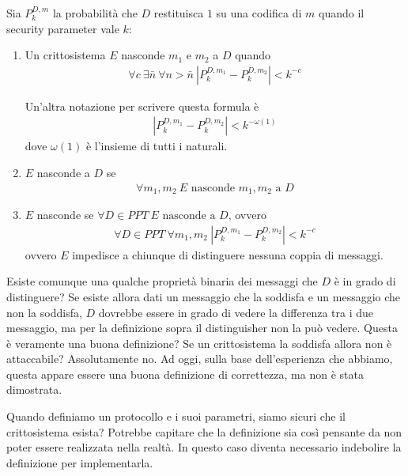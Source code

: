 \begin{definition}
Sia $P_k^{D, m}$ la probabilità che $D$ restituisca $1$ su una codifica di $m$ quando il security parameter vale $k$:
\begin{enumerate}
    \item Un crittosistema $E$ nasconde $m_1$ e $m_2$ a $D$ quando
\begin{align*}
   \forall c \ \exists {\bar{n}} \ \forall n > \bar{n} \ \left|P_{k}^{D, m_1} - P_{k}^{D, m_2}\right| < k^{-c}
\end{align*}

\noindent Un'altra notazione per scrivere questa formula è
\begin{align*}
    \left| P_k^{D, m_1} - P_k^{D, m_2} \right| < k^{-\omega(1)}
\end{align*}
\noindent dove $\omega(1)$ è l'insieme di tutti i naturali.

\item $E$ nasconde a $D$ se 
\begin{align*}
    \forall m_1, m_2 \ E \text{ nasconde } m_1, m_2 \text{ a } D
\end{align*}

\item $E$ nasconde se $\forall D \in PPT \ E \text{ nasconde a } D$, ovvero
\begin{align*}
    \forall D \in PPT \ \forall m_1,m_2 \ \left|P_{k}^{D, m_1} - P_{k}^{D, m_2}\right| < k^{-c}
\end{align*}
\noindent ovvero $E$ impedisce a chiunque di distinguere nessuna coppia di messaggi. 
\end{enumerate}
\end{definition}

\noindent Esiste comunque una qualche proprietà binaria dei messaggi che $D$ è in grado di distinguere? Se esiste allora dati un messaggio che la soddisfa e un messaggio che non la soddisfa, $D$ dovrebbe essere in grado di vedere la differenza tra i due messaggio, ma per la definizione sopra il distinguisher non la può vedere. Questa è veramente una buona definizione? Se un crittosistema la soddisfa allora non è attaccabile? Assolutamente no. Ad oggi, sulla base dell'esperienza che abbiamo, questa appare essere una buona definizione di correttezza, ma non è stata dimostrata. 

Quando definiamo un protocollo e i suoi parametri, siamo sicuri che il crittosistema esista? Potrebbe capitare che la definizione sia così pensante da non poter essere realizzata nella realtà. In questo caso diventa necessario indebolire la definizione per implementarla. 

